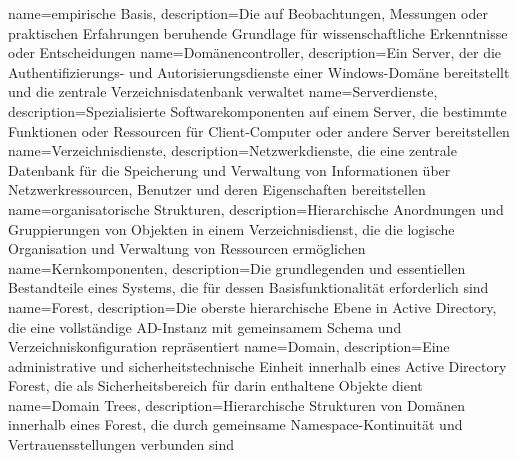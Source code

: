{
	name={em\-pi\-ri\-sche Ba\-sis},
	description={Die auf Be\-ob\-ach\-tun\-gen, Mes\-sun\-gen oder prak\-ti\-schen Er\-fah\-run\-gen be\-ru\-hen\-de Grund\-la\-ge für wis\-sen\-schaft\-li\-che Er\-kennt\-nis\-se oder Ent\-schei\-dun\-gen}
}
{
	name={Do\-mä\-nen\-con\-trol\-ler},
	description={Ein Ser\-ver, der die Au\-then\-ti\-fi\-zie\-rungs- und Au\-to\-ri\-sie\-rungs\-diens\-te ei\-ner Win\-dows-Do\-mä\-ne be\-reit\-stellt und die zen\-tra\-le Ver\-zeich\-nis\-da\-ten\-bank ver\-wal\-tet}
}
{
	name={Ser\-ver\-diens\-te},
	description={Spe\-zia\-li\-sier\-te Soft\-ware\-kom\-po\-nen\-ten auf ei\-nem Ser\-ver, die be\-stimm\-te Funk\-tio\-nen oder Res\-sour\-cen für Cli\-ent-Com\-pu\-ter oder an\-de\-re Ser\-ver be\-reit\-stel\-len}
}
{
	name={Ver\-zeich\-nis\-diens\-te},
	description={Netz\-werk\-diens\-te, die eine zen\-tra\-le Da\-ten\-bank für die Spei\-che\-rung und Ver\-wal\-tung von In\-for\-ma\-tio\-nen über Netz\-werk\-res\-sour\-cen, Be\-nut\-zer und de\-ren Ei\-gen\-schaf\-ten be\-reit\-stel\-len}
}
{
	name={or\-ga\-ni\-sa\-to\-ri\-sche Struk\-tu\-ren},
	description={Hier\-ar\-chi\-sche An\-ord\-nun\-gen und Grup\-pie\-run\-gen von Ob\-jek\-ten in ei\-nem Ver\-zeich\-nis\-dienst, die die lo\-gi\-sche Or\-ga\-ni\-sa\-ti\-on und Ver\-wal\-tung von Res\-sour\-cen er\-mög\-li\-chen}
}
{
	name={Kern\-kom\-po\-nen\-ten},
	description={Die grund\-le\-gen\-den und es\-sen\-ti\-el\-len Be\-stand\-tei\-le ei\-nes Sys\-tems, die für des\-sen Ba\-sis\-funk\-tio\-na\-li\-tät er\-for\-der\-lich sind}
}
{
	name={Fo\-rest},
	description={Die obers\-te hier\-ar\-chi\-sche Ebe\-ne in Ac\-tive Di\-rec\-to\-ry, die eine voll\-stän\-di\-ge AD-In\-stanz mit ge\-mein\-sa\-mem Sche\-ma und Ver\-zeich\-nis\-kon\-fi\-gu\-ra\-ti\-on re\-prä\-sen\-tiert}
}
{
	name={Do\-main},
	description={Eine ad\-mi\-nis\-tra\-ti\-ve und si\-cher\-heits\-tech\-ni\-sche Ein\-heit in\-ner\-halb ei\-nes Ac\-tive Di\-rec\-to\-ry Fo\-rest, die als Si\-cher\-heits\-be\-reich für da\-rin ent\-hal\-te\-ne Ob\-jek\-te dient}
}
{
	name={Do\-main Trees},
	description={Hier\-ar\-chi\-sche Struk\-tu\-ren von Do\-mä\-nen in\-ner\-halb ei\-nes Fo\-rest, die durch ge\-mein\-sa\-me Name\-space-Kon\-ti\-nui\-tät und Ver\-trau\-ens\-stel\-lun\-gen ver\-bun\-den sind}
}

